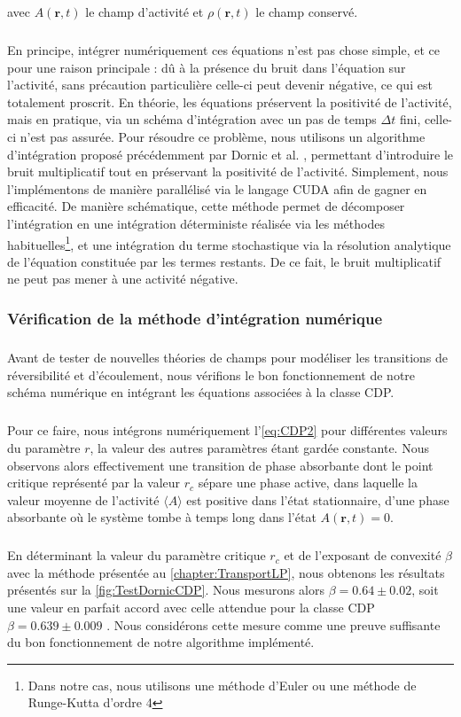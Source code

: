 \noindent avec $A(\mathbf{r}, t)$ le champ d'activité et $\rho (\mathbf{r}, t)$ le champ conservé.

\subparagraph{}En principe, intégrer numériquement ces équations n'est pas chose simple, et ce pour une raison principale : dû à la présence du bruit dans l'équation sur l'activité, sans précaution particulière celle-ci peut devenir négative, ce qui est totalement proscrit. En théorie, les équations préservent la positivité de l'activité, mais en pratique, via un schéma d'intégration avec un pas de temps $\Delta t$ fini, celle-ci n'est pas assurée. Pour résoudre ce problème, nous utilisons un algorithme d'intégration proposé précédemment par Dornic et al. \cite{dornic_integration_2005}, permettant d'introduire le bruit multiplicatif tout en préservant la positivité de l'activité. Simplement, nous l'implémentons de manière parallélisé via le langage CUDA afin de gagner en efficacité. De manière schématique, cette méthode permet de décomposer l'intégration en une intégration déterministe réalisée via les méthodes habituelles\footnote{Dans notre cas, nous utilisons une méthode d'Euler ou une méthode de Runge-Kutta d'ordre 4}, et une intégration du terme stochastique via la résolution analytique de l'équation constituée par les termes restants. De ce fait, le bruit multiplicatif ne peut pas mener à une activité négative.

\subsubsection{Vérification de la méthode d'intégration numérique}

\subparagraph{}Avant de tester de nouvelles théories de champs pour modéliser les transitions de réversibilité et d'écoulement, nous vérifions le bon fonctionnement de notre schéma numérique en intégrant les équations associées à la classe CDP.

\subparagraph{}Pour ce faire, nous intégrons numériquement l'\autoref{eq:CDP2} pour différentes valeurs du paramètre $r$, la valeur des autres paramètres étant gardée constante. Nous observons alors effectivement une transition de phase absorbante dont le point critique représenté par la valeur $r_c$ sépare une phase active, dans laquelle la valeur moyenne de l'activité $\langle A \rangle$ est positive dans l'état stationnaire, d'une phase absorbante où le système tombe à temps long dans l'état $A(\mathbf{r}, t) = 0$.

\subparagraph{}En déterminant la valeur du paramètre critique $r_c$ et de l'exposant de convexité $\beta$ avec la méthode présentée au \autoref{chapter:TransportLP}, nous obtenons les résultats présentés sur la \autoref{fig:TestDornicCDP}. Nous mesurons alors $\beta = 0.64 \pm 0.02$, soit une valeur en parfait accord avec celle attendue pour la classe CDP $\beta = 0.639 \pm 0.009$ \cite{lubeck_universal_2004}. Nous considérons cette mesure comme une preuve suffisante du bon fonctionnement de notre algorithme implémenté.

